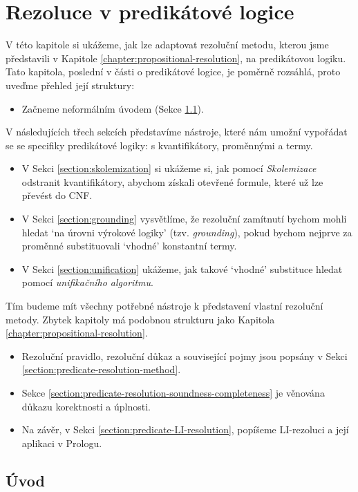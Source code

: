 \chapter{Rezoluce v predikátové logice} 
\label{chapter:predicate-resolution}

V této kapitole si ukážeme, jak lze adaptovat rezoluční metodu, kterou jsme představili v Kapitole \ref{chapter:propositional-resolution}, na predikátovou logiku. Tato kapitola, poslední v části o predikátové logice, je poměrně rozsáhlá, proto uveďme přehled její struktury: 

\begin{itemize}
    \item Začneme neformálním úvodem (Sekce \ref{section:predicate-resolution-intro}).
\end{itemize}
V následujících třech sekcích představíme nástroje, které nám umožní vypořádat se se specifiky predikátové logiky: s kvantifikátory, proměnnými a termy.
\begin{itemize}
    \item V Sekci \ref{section:skolemization} si ukážeme si, jak pomocí \emph{Skolemizace} odstranit kvantifikátory, abychom získali otevřené formule, které už lze převést do CNF.
    \item V Sekci \ref{section:grounding} vysvětlíme, že rezoluční zamítnutí bychom mohli hledat `na úrovni výrokové logiky' (tzv. \emph{grounding}), pokud bychom nejprve za proměnné substituovali `vhodné' konstantní termy.
    \item V Sekci \ref{section:unification} ukážeme, jak takové `vhodné' substituce hledat pomocí \emph{unifikačního algoritmu}.
\end{itemize}
Tím budeme mít všechny potřebné nástroje k představení vlastní rezoluční metody. Zbytek kapitoly má podobnou strukturu jako Kapitola \ref{chapter:propositional-resolution}.
\begin{itemize}
    \item Rezoluční pravidlo, rezoluční důkaz a související pojmy jsou popsány v Sekci \ref{section:predicate-resolution-method}.
    \item Sekce \ref{section:predicate-resolution-soundness-completeness} je věnována důkazu korektnosti a úplnosti.
    \item Na závěr, v Sekci \ref{section:predicate-LI-resolution}, popíšeme LI-rezoluci a její aplikaci v Prologu.
\end{itemize}


\section{Úvod}\label{section:predicate-resolution-intro}


